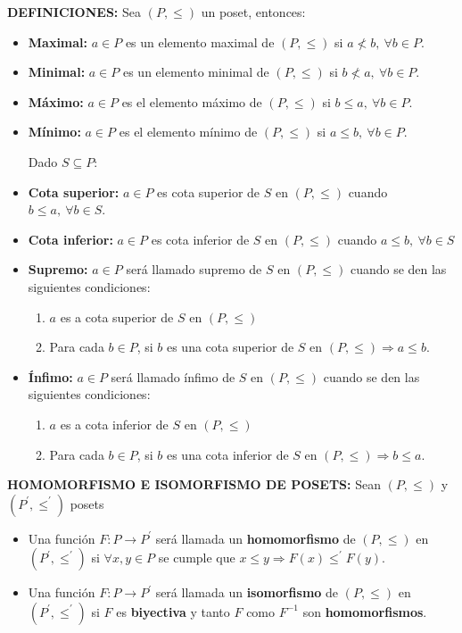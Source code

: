   \PN \textbf{DEFINICIONES:} Sea $(P,\leq)$ un poset, entonces:
  \begin{itemize}
    \item \textbf{Maximal:} $a \in P$ es un elemento maximal de $(P,\leq)$ si $a \nless b, \ \forall b \in P$.
    \item \textbf{Minimal:} $a \in P$ es un elemento minimal de $(P,\leq)$ si $b \nless a, \ \forall b \in P$.
    \item \textbf{Máximo:} $a \in P$ es el elemento máximo de $(P,\leq)$ si $b \leq a, \ \forall b \in P$.
    \item \textbf{Mínimo:} $a \in P$ es el elemento mínimo de $(P,\leq )$ si $a \leq b, \ \forall b \in P$.

    \vspace{3mm}
    \PN Dado $S \subseteq P$:
    \item \textbf{Cota superior:} $a \in P$ es cota superior de $S$ en $(P,\leq)$ cuando $b \leq a, \ \forall b \in S$.
    \item \textbf{Cota inferior:} $a \in P$ es cota inferior de $S$ en $(P,\leq)$ cuando $a \leq b, \ \forall b \in S$
    \item \textbf{Supremo:} $a \in P$ será llamado supremo de $S$ en $(P,\leq)$ cuando se den las siguientes
    condiciones:
      \begin{enumerate}
        \item $a$ es a cota superior de $S$ en $(P,\leq)$
        \item Para cada $b \in P$, si $b$ es una cota superior de $S$ en $ (P,\leq) \Rightarrow a \leq b$.
      \end{enumerate}
    \item \textbf{Ínfimo:} $a \in P$ será llamado ínfimo de $S$ en $(P,\leq)$ cuando se den las siguientes
    condiciones:
      \begin{enumerate}
        \item $a$ es a cota inferior de $S$ en $(P,\leq)$
        \item Para cada $b \in P$, si $b$ es una cota inferior de $S$ en $ (P,\leq) \Rightarrow b \leq a$.
      \end{enumerate}
  \end{itemize}

  \PN \textbf{HOMOMORFISMO E ISOMORFISMO DE POSETS:} Sean $(P,\leq)$ y $(P^{\prime},\leq^{\prime})$ posets
  \begin{itemize}
    \item Una función $F: P \rightarrow P^{\prime}$ será llamada un \textbf{homomorfismo} de $(P,\leq)$ en
      $(P^{\prime},\leq^{\prime})$ si $ \forall x, y \in P$ se cumple que $x \leq y \Rightarrow F(x) \leq^{\prime} F(y)$.
    \item Una función $F: P \rightarrow P^{\prime}$ será llamada un \textbf{isomorfismo} de $(P,\leq)$ en
      $(P^{\prime},\leq^{\prime})$ si $F$ es \textbf{biyectiva} y tanto $F$ como $F^{-1}$ son \textbf{homomorfismos}.
  \end{itemize}
